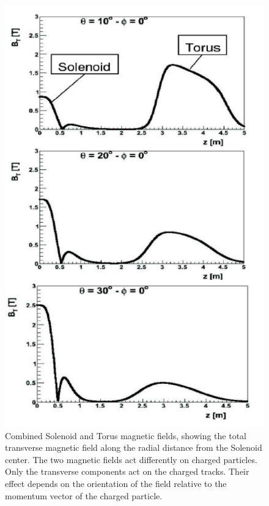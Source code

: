 \documentclass[final,3p,twocolumn]{elsarticle}
\begin{document}
\begin{figure}[htbp!]
\centerline{\includegraphics[width=1.0\columnwidth]{magfield.png}}
\caption{Combined Solenoid and Torus magnetic fields, showing the total transverse magnetic field along the radial
distance from the Solenoid center. The two magnetic fields act differently on charged particles. Only the transverse
components act on the charged tracks. Their effect depends on the orientation of the field relative to the momentum
vector of the charged particle.} 
\label{solenoid-torus}
\end{figure}

\end{document}
